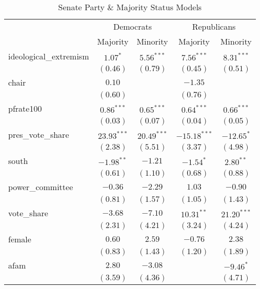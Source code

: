 \documentclass[12pt]{article}
\begin{document}
\begin{table}[H]
	\begin{center}
		\caption{Senate Party \& Majority Status Models}
		\begin{tabular}{l c c c c }
			\hline
			& \multicolumn{2}{c}{Democrats} & \multicolumn{2}{c}{Republicans} \\
			\cline{2-5}
			& Majority & Minority & Majority & Minority \\
			\hline
			ideological\_extremism & $1.07^{*}$    & $5.56^{***}$  & $7.56^{***}$   & $8.31^{***}$  \\
			& $(0.46)$      & $(0.79)$      & $(0.45)$       & $(0.51)$      \\
			chair                  & $0.10$        &               & $-1.35$        &               \\
			& $(0.60)$      &               & $(0.76)$       &               \\
			pfrate100              & $0.86^{***}$  & $0.65^{***}$  & $0.64^{***}$   & $0.66^{***}$  \\
			& $(0.03)$      & $(0.07)$      & $(0.04)$       & $(0.05)$      \\
			pres\_vote\_share      & $23.93^{***}$ & $20.49^{***}$ & $-15.18^{***}$ & $-12.65^{*}$  \\
			& $(2.38)$      & $(5.51)$      & $(3.37)$       & $(4.98)$      \\
			south                  & $-1.98^{**}$  & $-1.21$       & $-1.54^{*}$    & $2.80^{**}$   \\
			& $(0.61)$      & $(1.10)$      & $(0.68)$       & $(0.88)$      \\
			power\_committee       & $-0.36$       & $-2.29$       & $1.03$         & $-0.90$       \\
			& $(0.81)$      & $(1.57)$      & $(1.05)$       & $(1.43)$      \\
			vote\_share            & $-3.68$       & $-7.10$       & $10.31^{**}$   & $21.20^{***}$ \\
			& $(2.31)$      & $(4.21)$      & $(3.24)$       & $(4.24)$      \\
			female                 & $0.60$        & $2.59$        & $-0.76$        & $2.38$        \\
			& $(0.83)$      & $(1.43)$      & $(1.20)$       & $(1.89)$      \\
			afam                   & $2.80$        & $-3.08$       &                & $-9.46^{*}$   \\
			& $(3.59)$      & $(4.36)$      &                & $(4.71)$      \\

\end{tabular}
\end{center}
\end{table}
\end{document}
